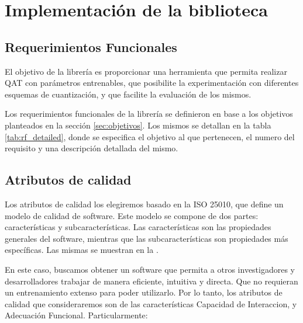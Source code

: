 \section{Implementación de la biblioteca}
\label{sec:implementacion}

\subsection{Requerimientos Funcionales}

El objetivo de la librería es proporcionar una herramienta que permita realizar QAT con parámetros entrenables, que posibilite la experimentación con diferentes esquemas de cuantización, y que facilite la evaluación de los mismos.

Los requerimientos funcionales de la librería se definieron en base a los objetivos planteados en la sección \ref{sec:objetivos}. Los mismos se detallan en la tabla \ref{tab:rf_detailed}, donde se especifica el objetivo al que pertenecen, el numero del requisito y una descripción detallada del mismo.



\subsection{Atributos de calidad}
\label{sec:atributos_calidad}

Los atributos de calidad los elegiremos basado en la ISO 25010, que define un modelo de calidad de software. Este modelo se compone de dos partes: características y subcaracterísticas. Las características son las propiedades generales del software, mientras que las subcaracterísticas son propiedades más específicas. Las mismas se muestran en la .


En este caso, buscamos obtener un software que permita a otros investigadores y desarrolladores trabajar de manera eficiente, intuitiva y directa. Que no requieran un entrenamiento extenso para poder utilizarlo. Por lo tanto, los atributos de calidad que consideraremos son de las características Capacidad de Interaccion, y Adecuación Funcional. Particularmente:

